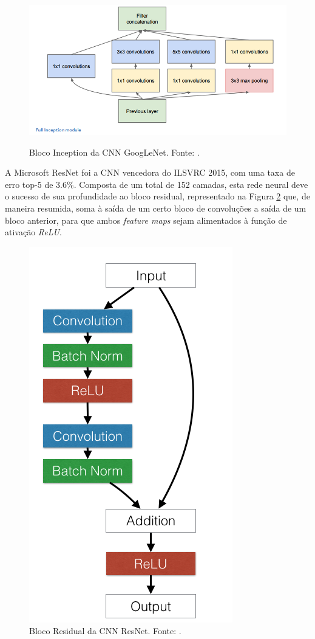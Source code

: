 \begin{figure}[h!]
	\centering
	\caption{Bloco Inception da CNN GoogLeNet. Fonte: \cite{9dlpapers}.}
	\includegraphics[width=0.7\linewidth]{img/GoogLeNet}
	\label{fig:bloco_inception}
\end{figure}

A Microsoft ResNet foi a CNN vencedora do ILSVRC 2015, com uma taxa de erro top-5 de $3.6\%$. Composta de um total de 152 camadas, esta rede neural deve o sucesso de sua profundidade ao bloco residual, representado na Figura \ref{fig:bloco_residual} que, de maneira resumida, soma à saída de um certo bloco de convoluções a saída de um bloco anterior, para que ambos \emph{feature maps} sejam alimentados à função de ativação \emph{ReLU}.

\begin{figure}[h!]
\centering
\caption{Bloco Residual da CNN ResNet. Fonte: \cite{torch:resnet}.}\label{fig:bloco_residual}
\includegraphics[height=0.3\textheight]{img/resnets_modelvariants}
\end{figure}

